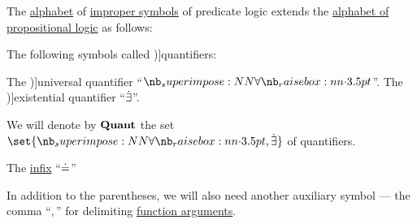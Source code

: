 \begin{definition}\label{def:predicate_logic_alphabet}\mimprovised
  The \hyperref[def:formal_language/alphabet]{alphabet} of \hyperref[con:improper_symbol]{improper symbols} of predicate logic extends the \hyperref[def:propositional_alphabet]{alphabet of propositional logic} as follows:
  \begin{thmenum}
     The following symbols called \term[ru=кванторы (\cite[72]{ШеньВерещагин2017ЯзыкиИИсчисления})]{quantifiers}:
    \begin{thmenum}
       The \term[ru=квантор общости (\cite[61]{Эдельман1975Логика})]{universal quantifier} \enquote{\( \synforall \)}.
       The \term[ru=квантор существования (\cite[61]{Эдельман1975Логика})]{existential quantifier} \enquote{\( \mathord{\dot{\exists}} \)}.
    \end{thmenum}

    We will denote by \( \op*{Quant} \) the set \( \set{ \synforall, \synexists } \) of quantifiers.

     The \hyperref[def:function_application_syntax]{infix}  \enquote{\( \doteq \)}

     In addition to the parentheses, we will also need another auxiliary symbol --- the comma \enquote{\( , \)} for delimiting \hyperref[con:function_arguments]{function arguments}.
  \end{thmenum}
\end{definition}

